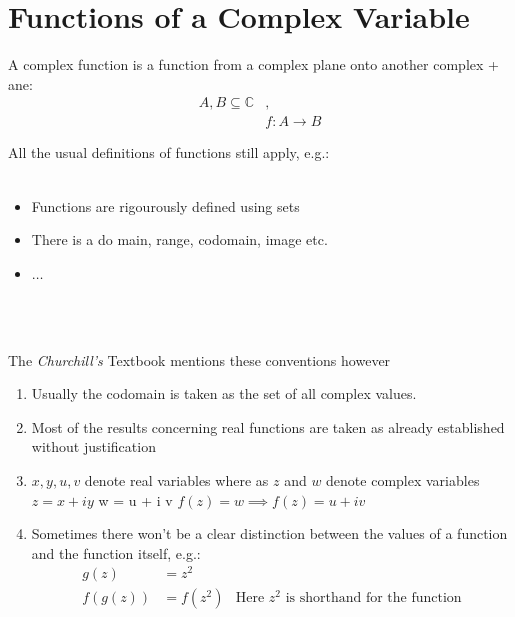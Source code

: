 \documentclass[class=article, crop=false]{standalone}
\begin{document}
	\maketitle
	\tableofcontents
	
	
	
\section{Functions of a Complex Variable}
A complex function is a function from a complex plane onto another complex + ane:
\begin{align*}
  A, B \subseteq \mathbb{C} &, \\
  & f: A \rightarrow B
\end{align*}

All the usual definitions of functions still apply, e.g.: 
\\ \

\hfill\begin{minipage}{\dimexpr\textwidth-3cm}
  \begin{itemize}
    \item Functions are rigourously defined using sets 
    \item There is a do main, range, codomain, image etc.
    \item $\dots$
  \end{itemize}
\end{minipage}
\\ \

The \textit{Churchill's} Textbook mentions these conventions however
\begin{enumerate}
  \item Usually the codomain is taken as the set of all complex values.
  \item Most of the results concerning real functions are taken as already established without justification
  \item $x, y, u, v$ denote real variables where as  $z$ and $w$ denote complex variables
    \subitem $z = x +  i y$ 
    \subitem w = u +  i v
    \subitem $f(z) = w \implies f\left( z \right) = u +  iv$
  \item Sometimes there won't be a clear distinction between the values of a function and the function itself, e.g.:
    \begin{align*}
      g\left( z \right) &=  z^2\\
      f\left( g\left( z \right) \right) &=  f\left( z^2 \right)  &\text{Here $z^2$ is shorthand for the function}
    \end{align*}
\end{enumerate}
\end{document}
